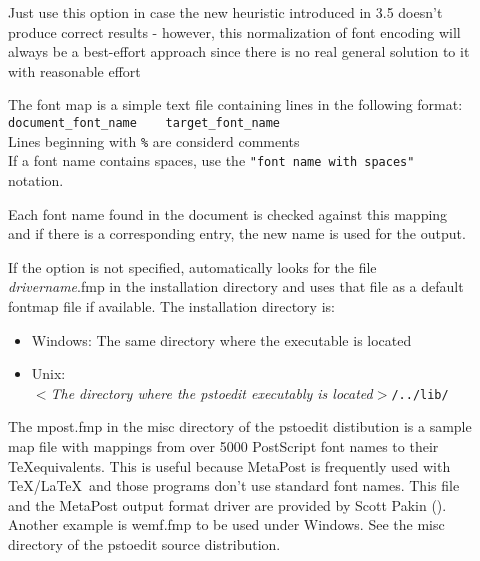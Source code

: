 \documentclass[english,a4paper]{article}
\begin{document}
\begin{description}
\item[] 
Just use this option in case the new heuristic introduced in 3.5 doesn't produce correct results - however, this normalization of font encoding will always be a best-effort approach since there is no real general solution to it with reasonable effort


\item[] 
The font map is a simple text file containing lines in the following format:\\  
 

\verb+document_font_name    target_font_name+ \\
Lines beginning with \verb+%+ are considerd comments \\
 If a font name contains spaces, use the \verb+"font name with spaces"+ notation. 
 
Each font name found in the document is checked against this mapping and if there is a corresponding entry, the new name is used for the output.  

If  the  option is not specified,  automatically looks for the file \emph{drivername}.fmp in the installation directory and uses that file as a default fontmap file if available. The installation directory is:  

\begin{itemize} 
 
\item Windows: The same directory where the  executable is 
    located  
 
\item Unix: \\ 
$<$\emph{The directory where the pstoedit executably is located}$>$\verb+/../lib/+ 
 
\end{itemize} 
 
The mpost.fmp in the misc directory of the pstoedit distibution is a sample map file with mappings from over 5000 PostScript font names to their \TeX equivalents. This is useful because MetaPost is frequently used with \TeX/\LaTeX\ and those programs don't use standard font names. This file and the MetaPost output format driver are provided by Scott Pakin ().   Another example is wemf.fmp to be used under Windows. See the misc directory of the pstoedit source distribution. 


\end{description}
\end{document}
